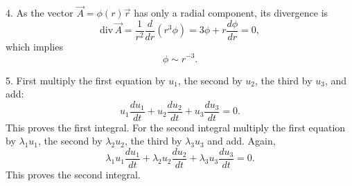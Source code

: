 \documentclass[14pt]{article}
\begin{document}
4. As the vector $\vec{A}=\phi(r)\vec{r}$ has only a radial component, its divergence is
$$
  \text{div}\,\vec{A}=\frac{1}{r^2}\frac{d}{dr}\left(r^3 \phi\right)=3\phi+r\frac{d\phi}{dr}=0,
$$
which implies
$$
  \phi\sim r^{-3}.
$$

5. First multiply the first equation by $u_1$, the second by $u_2$, the third by $u_3$, and add:
$$
  u_1 \frac{du_1}{dt}+u_2 \frac{du_2}{dt}+u_3 \frac{du_3}{dt}=0.
$$
This proves the first integral. For the second integral multiply the first equation by $\lambda_1 u_1$, the second by $\lambda_2 u_2$, the third by $\lambda_3 u_3$ and add. Again,
$$
  \lambda_1 u_1 \frac{du_1}{dt}+\lambda_2 u_2 \frac{du_2}{dt}+\lambda_3 u_3 \frac{du_3}{dt}=0.
$$
This proves the second integral.
\end{document}
